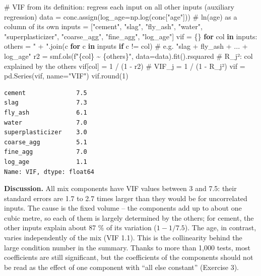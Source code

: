 \documentclass[
  letterpaper,
  DIV=11,
  numbers=noendperiod]{scrreprt}
\newenvironment{Shaded}{\begin{snugshade}}{\end{snugshade}}
\newcommand{\BuiltInTok}[1]{\textcolor[rgb]{0.00,0.23,0.31}{#1}}
\newcommand{\CommentTok}[1]{\textcolor[rgb]{0.37,0.37,0.37}{#1}}
\newcommand{\ControlFlowTok}[1]{\textcolor[rgb]{0.00,0.23,0.31}{\textbf{#1}}}
\newcommand{\DecValTok}[1]{\textcolor[rgb]{0.68,0.00,0.00}{#1}}
\newcommand{\KeywordTok}[1]{\textcolor[rgb]{0.00,0.23,0.31}{\textbf{#1}}}
\newcommand{\NormalTok}[1]{\textcolor[rgb]{0.00,0.23,0.31}{#1}}
\newcommand{\OperatorTok}[1]{\textcolor[rgb]{0.37,0.37,0.37}{#1}}
\newcommand{\SpecialCharTok}[1]{\textcolor[rgb]{0.37,0.37,0.37}{#1}}
\newcommand{\SpecialStringTok}[1]{\textcolor[rgb]{0.13,0.47,0.30}{#1}}
\newcommand{\StringTok}[1]{\textcolor[rgb]{0.13,0.47,0.30}{#1}}
\begin{document}
\begin{Shaded}
\begin{Highlighting}[]
\CommentTok{\# VIF from its definition: regress each input on all other inputs (auxiliary regression)}
\NormalTok{data }\OperatorTok{=}\NormalTok{ conc.assign(log\_age}\OperatorTok{=}\NormalTok{np.log(conc[}\StringTok{"age"}\NormalTok{]))           }\CommentTok{\# ln(age) as a column of its own}
\NormalTok{inputs }\OperatorTok{=}\NormalTok{ [}\StringTok{"cement"}\NormalTok{, }\StringTok{"slag"}\NormalTok{, }\StringTok{"fly\_ash"}\NormalTok{, }\StringTok{"water"}\NormalTok{, }\StringTok{"superplasticizer"}\NormalTok{,}
          \StringTok{"coarse\_agg"}\NormalTok{, }\StringTok{"fine\_agg"}\NormalTok{, }\StringTok{"log\_age"}\NormalTok{]}
\NormalTok{vif }\OperatorTok{=}\NormalTok{ \{\}}
\ControlFlowTok{for}\NormalTok{ col }\KeywordTok{in}\NormalTok{ inputs:}
\NormalTok{    others }\OperatorTok{=} \StringTok{" + "}\NormalTok{.join(c }\ControlFlowTok{for}\NormalTok{ c }\KeywordTok{in}\NormalTok{ inputs }\ControlFlowTok{if}\NormalTok{ c }\OperatorTok{!=}\NormalTok{ col)    }\CommentTok{\# e.g. "slag + fly\_ash + ... + log\_age"}
\NormalTok{    r2 }\OperatorTok{=}\NormalTok{ smf.ols(}\SpecialStringTok{f"}\SpecialCharTok{\{}\NormalTok{col}\SpecialCharTok{\}}\SpecialStringTok{ \textasciitilde{} }\SpecialCharTok{\{}\NormalTok{others}\SpecialCharTok{\}}\SpecialStringTok{"}\NormalTok{, data}\OperatorTok{=}\NormalTok{data).fit().rsquared   }\CommentTok{\# R\_j²: col explained by the others}
\NormalTok{    vif[col] }\OperatorTok{=} \DecValTok{1} \OperatorTok{/}\NormalTok{ (}\DecValTok{1} \OperatorTok{{-}}\NormalTok{ r2)                               }\CommentTok{\# VIF\_j = 1 / (1 {-} R\_j²)}
\NormalTok{vif }\OperatorTok{=}\NormalTok{ pd.Series(vif, name}\OperatorTok{=}\StringTok{"VIF"}\NormalTok{)}
\NormalTok{vif.}\BuiltInTok{round}\NormalTok{(}\DecValTok{1}\NormalTok{)}
\end{Highlighting}
\end{Shaded}

\begin{verbatim}
cement              7.5
slag                7.3
fly_ash             6.1
water               7.0
superplasticizer    3.0
coarse_agg          5.1
fine_agg            7.0
log_age             1.1
Name: VIF, dtype: float64
\end{verbatim}

\textbf{Discussion.} All mix components have VIF values between 3 and
7.5: their standard errors are 1.7 to 2.7 times larger than they would
be for uncorrelated inputs. The cause is the fixed volume -- the
components add up to about one cubic metre, so each of them is largely
determined by the others; for cement, the other inputs explain about 87
\% of its variation (\(1 - 1/7.5\)). The age, in contrast, varies
independently of the mix (VIF 1.1). This is the collinearity behind the
large condition number in the summary. Thanks to more than 1,000 tests,
most coefficients are still significant, but the coefficients of the
components should not be read as the effect of one component with ``all
else constant'' (Exercise 3).
\end{document}
